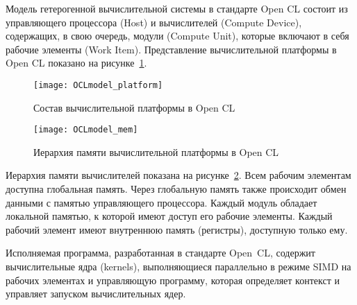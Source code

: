 Модель гетерогенной вычислительной системы в стандарте Open CL 
состоит из управляющего процессора (Host)
и вычислителей (Compute Device),
содержащих, в свою очередь, 
модули (Compute Unit),
которые включают в себя %
рабочие элементы (Work Item).
Представление вычислительной платформы в Open CL
показано на рисунке~\ref{fig:OCL_platform}.

\begin{figure}[h!]
  \centering
  \texttt{[image: OCLmodel\_platform]} 
  \caption{Состав вычислительной платформы в Open CL}
  \label{fig:OCL_platform}
\end{figure}
\FloatBarrier

\begin{figure}[h!]
  \centering
  \texttt{[image: OCLmodel\_mem]} 
  \caption{Иерархия памяти вычислительной платформы в Open CL}
  \label{fig:OCLmodel_mem} %
\end{figure}
\FloatBarrier




Иерархия памяти вычислителей показана на рисунке~\ref{fig:OCLmodel_mem}. 
Всем рабочим элементам доступна глобальная память. 
Через глобальную память также происходит обмен данными
с памятью управляющего процессора. 
Каждый модуль 
обладает локальной памятью, к которой имеют доступ
его рабочие элементы.
Каждый рабочий элемент имеют внутреннюю  память (регистры), доступную только ему.

Исполняемая программа, разработанная в стандарте Open~CL,
содержит %
вычислительные ядра (kernels), выполняющиеся
параллельно 
в режиме SIMD  
на рабочих элементах  %
и управляющую программу, которая
определяет контекст и 
управляет запуском вычислительных ядер.




